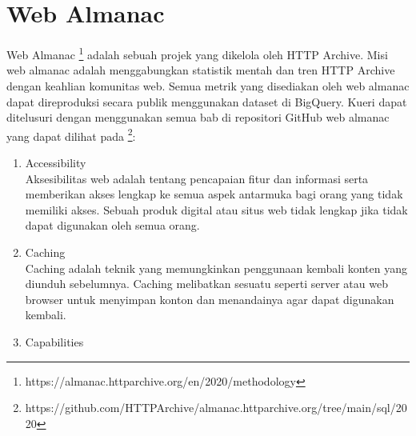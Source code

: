 \section{Web Almanac}
Web Almanac \footnote{https://almanac.httparchive.org/en/2020/methodology} adalah sebuah projek yang dikelola oleh HTTP Archive. Misi web almanac adalah menggabungkan statistik mentah dan tren HTTP Archive dengan keahlian komunitas web. Semua metrik yang disediakan oleh web almanac dapat direproduksi secara publik menggunakan dataset di BigQuery. Kueri dapat ditelusuri dengan menggunakan semua bab di repositori GitHub web almanac yang dapat dilihat pada \footnote{https://github.com/HTTPArchive/almanac.httparchive.org/tree/main/sql/2020}: 
\begin{enumerate}
	\item Accessibility\\
	Aksesibilitas web adalah tentang pencapaian fitur dan informasi serta memberikan akses lengkap ke semua aspek antarmuka bagi orang yang tidak memiliki akses. Sebuah produk digital atau situs web tidak lengkap jika tidak dapat digunakan oleh semua orang. 
	\item Caching\\
	Caching adalah teknik yang memungkinkan penggunaan kembali konten yang diunduh sebelumnya. Caching melibatkan sesuatu seperti server atau web browser untuk menyimpan konton dan menandainya agar dapat digunakan kembali.
	\item Capabilities\\
	

\end{enumerate}
